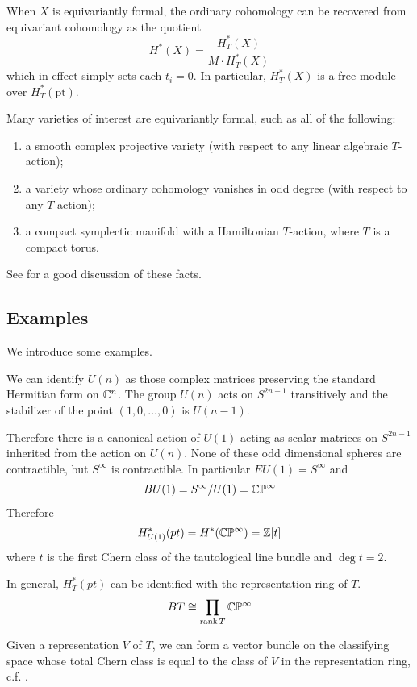 When $X$ is equivariantly formal,
the ordinary cohomology can be recovered from
equivariant cohomology as the quotient
\[
	H^*(X) = \frac{H^*_T(X)}{M \cdot H^*_T(X)}
\]
which in effect simply sets each $t_i = 0$.
In particular, $H^*_T(X)$ is a free module over $H^*_T(\text{pt})$.

\hfill

Many varieties of interest are equivariantly formal, such as all of the following:
\begin{enumerate}
	\item a smooth complex projective variety (with respect to any linear algebraic $T$-action);
	\item a variety whose ordinary cohomology vanishes in odd degree (with respect to any $T$-action);
	\item a compact symplectic manifold with a Hamiltonian $T$-action, where $T$ is a compact torus.
\end{enumerate}
See \cite{fulton-anderson} for a good discussion of these facts.

\subsection{Examples}
We introduce some examples.

\begin{example}
	We can identify $U(n)$ as those complex matrices preserving
	the standard Hermitian form on $\mathbb{C}^n$. The group $U(n)$ acts on $S^{2n-1}$ transitively
	and the stabilizer of the point $(1,0,\ldots,0)$ is $U(n-1)$.

	Therefore there is a canonical action of $U(1)$ acting as scalar matrices on $S^{2n-1}$
	inherited from the action on $U(n)$. None of these odd dimensional spheres are contractible,
	but $S^\infty$ is contractible. In particular $EU(1) = S^\infty$ and \begin{align*}
		BU(1) = S^\infty/U(1) = \mathbb{C}\mathbb{P}^\infty
	\end{align*}
	Therefore \begin{align*}
		H^*_{U(1)}(pt) = H^*(\mathbb{C}\mathbb{P}^\infty) = \mathbb{Z}[t]
	\end{align*} where $t$ is the first Chern class of the tautological line bundle and $\deg t = 2$.
\end{example}

\begin{example}
	In general, $H_T^*(pt)$ can be identified with the representation ring of $T$. \begin{align*}
		BT \cong \prod_{\operatorname{rank} T} \mathbb{C}\mathbb{P}^\infty
	\end{align*}

	Given a representation $V$ of $T$,
	we can form a vector bundle on the classifying space whose
	total Chern class is equal to the class of $V$ in the representation ring, c.f. \cite{huybrechts}.
\end{example}
